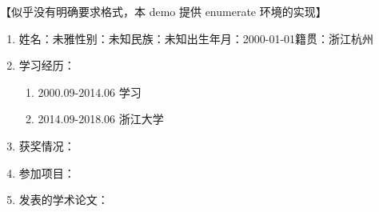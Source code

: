 \begin{resume}
    【似乎没有明确要求格式，本 demo 提供 enumerate 环境的实现】

    \begin{enumerate}[label=,leftmargin=0em]
    \item 姓名：未雅\quad 性别：未知\quad 民族：未知\quad 出生年月：2000-01-01\quad 籍贯：浙江杭州
    \item 学习经历：
    \begin{enumerate}[label=]
    \item 2000.09-2014.06 学习
    \item 2014.09-2018.06 浙江大学
    \end{enumerate}
    \item 获奖情况：
    \item 参加项目：
    \item 发表的学术论文：
    \end{enumerate}
\end{resume}